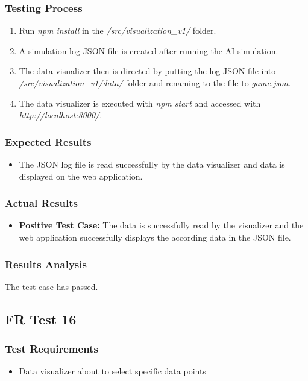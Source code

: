 \documentclass[12pt, titlepage]{article}
\providecommand{\DIFaddbegin}{} %
\providecommand{\DIFaddend}{} %
\begin{document}
\subsubsection{Testing Process}
\begin{enumerate}
    \item Run \textit{npm install} in the \textit{/src/visualization\_v1/} folder.
    \item A simulation log JSON file is created after running the AI simulation.
    \item The data visualizer then is directed by putting the log JSON file into \textit{/src/visualization\_v1/data/} folder and renaming to the file to \textit{game.json}.
    \item The data visualizer is executed with \textit{npm start} and accessed with \textit{http://localhost:3000/}.
\end{enumerate}
\subsubsection{Expected Results}
\begin{itemize}
    \item The JSON log file is read successfully by the data visualizer and data is displayed on the web application.
\end{itemize}
\subsubsection{Actual Results}
\begin{itemize}
    \item \textbf{Positive Test Case:} The data is successfully read by the visualizer and the web application successfully displays the according data in the JSON file.
\end{itemize}
\subsubsection{Results Analysis}
The test case has passed.

\subsection{FR Test 16}\DIFaddbegin \label{FRT16} 
\DIFaddend \subsubsection{Test Requirements}
\begin{itemize}
    \item Data visualizer about to select specific data points
\end{itemize}
\end{document}
